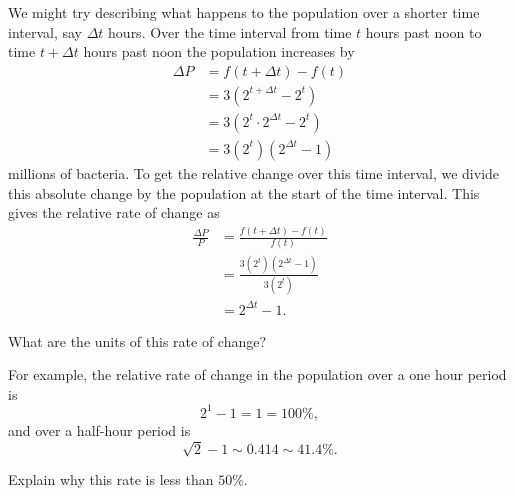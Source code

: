 \documentclass{ximera}
\begin{document}
We might try describing what happens to the population over a shorter time interval, say $\Delta t$ hours. Over the time interval from time $t$ hours past noon to time $t+\Delta t$ hours past noon the population increases by 
\begin{align*}
  \Delta P &=  f(t + \Delta t) - f(t)  \\ 
                               &=  3 (2^{t+\Delta t} - 2^t) \\
                               &=  3 (2^t \cdot 2^{\Delta t} - 2^t) \\
                               &=  3 (2^t) (2^{\Delta t} - 1) 
\end{align*}
millions of bacteria. To get the relative change over this time interval, we divide this absolute change by the population at the start of the time interval. This gives the relative rate of change as
\begin{align*}
   \frac{\Delta P}{P} &=  \frac{f(t + \Delta t) - f(t)}{f(t)}  \\ 
                              &= \frac{3 (2^t) (2^{\Delta t} - 1)}{3 (2^t)} \\
                              &= 2^{\Delta t} - 1.
\end{align*}

\begin{question} \label{QODFERerre}
What are the units of this rate of change?
\end{question}

For example, the relative rate of change in the population over a one hour period is
\[ 
        2^1 - 1 = 1 = 100\%,
\]
and over a half-hour period is
\[
    \sqrt{2} - 1 \sim 0.414 \sim 41.4\%.
\]

\begin{question} \label{QERdftrre}
Explain why this rate is less than $50\%$.
\end{question}
\end{document}
